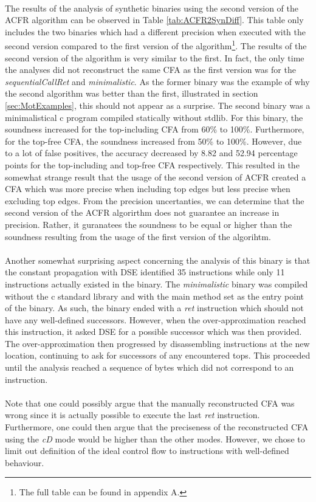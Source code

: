 \documentclass{kththesis}
\renewcommand{\it}[1]{\textit{#1}}
\begin{document}
\\
The results of the analysis of synthetic binaries using the second version of the ACFR algorithm can be observed in Table \ref{tab:ACFR2SynDiff}. This table only includes the two binaries which had a different precision when executed with the second version compared to the first version of the algorithm\footnote{The full table can be found in appendix A.}. The results of the second version of the algorithm is very similar to the first. In fact, the only time the analyses did not reconstruct the same CFA as the first version was for the  \it{sequentialCallRet} and \it{minimalistic}. As the former binary was the example of why the second algorithm was better than the first, illustrated in section \ref{sec:MotExamples}, this should not appear as a surprise. The second binary was a minimalistical c program compiled statically without stdlib. For this binary, the soundness increased for the top-including CFA from 60\% to 100\%. Furthermore, for the top-free CFA, the soundness increased from 50\% to 100\%. However, due to a lot of false positives, the accuracy decreased by 8.82 and 52.94 percentage points for the top-including and top-free CFA respectively. This resulted in the somewhat strange result that the usage of the second version of ACFR created a CFA which was more precise when including top edges but less precise when excluding top edges. From the precision uncertanties, we can determine that the second version of the ACFR algorirthm does not guarantee an increase in precision. Rather, it guranatees the soundness to be equal or higher than the soundness resulting from the usage of the first version of the algorihtm.
\\ \\
Another somewhat surprising aspect concerning the analysis of this binary is that the constant propagation with DSE identified 35 instructions while only 11 instructions actually existed in the binary. The \it{minimalistic} binary was compiled without the c standard library and with the main method set as the entry point of the binary. As such, the binary ended with a \it{ret} instruction which should not have any well-defined successors. However, when the over-approximation reached this instruction, it asked DSE for a possible successor which was then provided. The over-approximation then progressed by disassembling instructions at the new location, continuing to ask for successors of any encountered tops. This proceeded until the analysis reached a sequence of bytes which did not correspond to an instruction.
\\ \\
Note that one could possibly argue that the manually reconstructed CFA was wrong since it is actually possible to execute the last \it{ret} instruction. Furthermore, one could then argue that the preciseness of the reconstructed CFA using the \it{cD} mode would be higher than the other modes. However, we chose to limit out definition of the ideal control flow to instructions with well-defined behaviour. 
\end{document}
